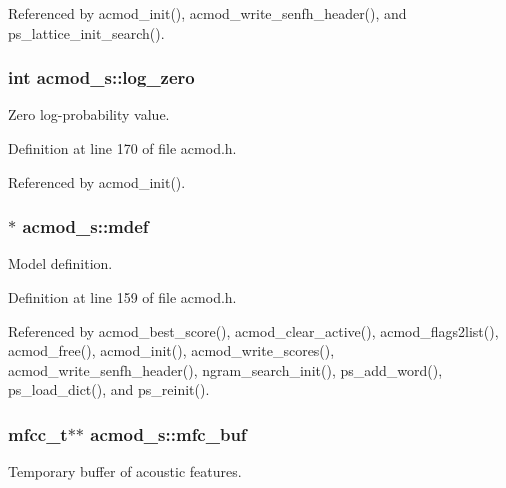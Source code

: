 Referenced by acmod\-\_\-init(), acmod\-\_\-write\-\_\-senfh\-\_\-header(), and ps\-\_\-lattice\-\_\-init\-\_\-search().

\subsubsection[{log\-\_\-zero}]{\setlength{\rightskip}{0pt plus 5cm}int acmod\-\_\-s\-::log\-\_\-zero}\label{structacmod__s_a95d5195647b6395d95433d45e3f74d51}


Zero log-\/probability value. 



Definition at line 170 of file acmod.\-h.



Referenced by acmod\-\_\-init().

\subsubsection[{mdef}]{$\ast$ acmod\-\_\-s\-::mdef}\label{structacmod__s_a351548ff5547c29b4a684e10434a51dd}


Model definition. 



Definition at line 159 of file acmod.\-h.



Referenced by acmod\-\_\-best\-\_\-score(), acmod\-\_\-clear\-\_\-active(), acmod\-\_\-flags2list(), acmod\-\_\-free(), acmod\-\_\-init(), acmod\-\_\-write\-\_\-scores(), acmod\-\_\-write\-\_\-senfh\-\_\-header(), ngram\-\_\-search\-\_\-init(), ps\-\_\-add\-\_\-word(), ps\-\_\-load\-\_\-dict(), and ps\-\_\-reinit().

\subsubsection[{mfc\-\_\-buf}]{\setlength{\rightskip}{0pt plus 5cm}mfcc\-\_\-t$\ast$$\ast$ acmod\-\_\-s\-::mfc\-\_\-buf}\label{structacmod__s_a5ded3dce0428a6ecba97b5d3486e7fa9}


Temporary buffer of acoustic features. 



